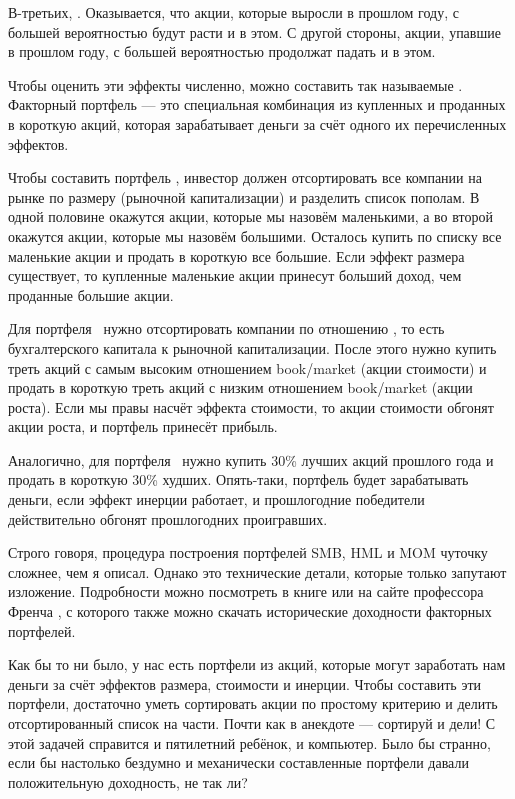 В-третьих, . Оказывается, что акции, 
которые выросли в прошлом году, с большей вероятностью будут расти и в этом. С 
другой стороны, акции, упавшие в прошлом году, с большей вероятностью продолжат 
падать и в этом.

Чтобы оценить эти эффекты численно, можно составить так называемые 
. Факторный портфель --- это 
специальная комбинация из купленных и проданных в короткую акций, которая 
зарабатывает деньги за счёт одного их перечисленных эффектов.

Чтобы составить портфель , инвестор должен 
отсортировать все компании на рынке по размеру (рыночной капитализации) и  
разделить список пополам. В одной половине окажутся акции, которые мы назовём 
маленькими, а во второй окажутся акции, которые мы назовём большими. Осталось 
купить по списку все маленькие акции и продать в короткую все большие. Если 
эффект размера существует, то купленные маленькие акции принесут больший доход, 
чем проданные большие акции.

Для портфеля \ нужно 
отсортировать компании по отношению , то есть бухгалтерского 
капитала к рыночной капитализации. После этого нужно купить треть акций с самым 
высоким отношением book/market (акции стоимости) и продать в короткую треть 
акций с низким отношением book/market (акции роста). Если мы правы насчёт 
эффекта стоимости, то акции стоимости обгонят акции роста, и портфель принесёт 
прибыль.

Аналогично, для портфеля \ нужно купить 30\% лучших акций 
прошлого года и продать в короткую 30\% худших. Опять-таки, портфель будет 
зарабатывать деньги, если эффект инерции работает, и прошлогодние победители 
действительно обгонят прошлогодних проигравших.

Строго говоря, процедура построения портфелей SMB, HML и MOM чуточку сложнее, 
чем я описал. Однако это технические детали, которые только запутают изложение. 
Подробности можно посмотреть в книге \cite[ch.~9--11]{bali2016empirical} или на 
сайте профессора Френча \cite{kennethFrench}, с которого также можно скачать 
исторические доходности факторных портфелей.

Как бы то ни было, у нас есть портфели из акций, которые могут заработать нам 
деньги за счёт эффектов размера, стоимости и инерции. Чтобы составить эти 
портфели, достаточно уметь сортировать акции по простому критерию и делить
отсортированный список на части. Почти как в анекдоте --- сортируй и дели! С 
этой задачей справится и пятилетний ребёнок, и компьютер. Было бы странно, если 
бы настолько бездумно и механически составленные портфели давали положительную 
доходность, не так ли?

